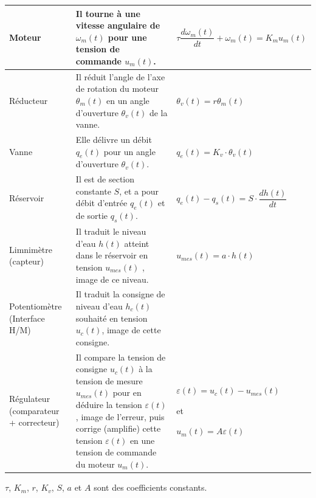 \documentclass[10pt,fleqn]{article} %
\begin{document}
\begin{center}
\begin{tabular}{|p{3cm}|p{7cm}|l|}
\hline
Moteur & 
Il tourne à une vitesse angulaire de $\omega_m(t)$ pour une tension de commande $u_m(t)$. &
$\tau \dfrac{d\omega_m(t)}{dt} + \omega_m(t) = K_m u_m(t)$ \\
\hline
Réducteur & 
Il réduit l'angle de l'axe de rotation du moteur $\theta_m(t)$
en un angle d'ouverture $\theta_v(t)$ de la vanne.&
$\theta_v(t)=r\theta_m(t)$\\
\hline
Vanne & 
Elle délivre un débit $q_e(t)$ pour un angle d'ouverture $\theta_v(t)$. &
$q_e(t)= K_v \cdot \theta_v(t) $ \\
\hline
Réservoir & 
Il est de section constante $S$, et a pour débit d’entrée
$q_e (t)$ et de sortie $q_s (t)$.&
$q_e(t)-q_s(t)=S\cdot\dfrac{dh(t)}{dt}$\\
\hline
Limnimètre (capteur) & 
Il traduit le niveau d'eau $h(t)$ atteint dans le réservoir
en tension $u_{mes}(t)$ , image de ce niveau. &
$u_{mes}(t) = a \cdot h(t)$ \\
\hline
Potentiomètre (Interface H/M) & 
Il traduit la consigne de niveau d'eau $h_c(t)$ souhaité
en tension $u_c(t)$, image de cette consigne. &
\\
\hline 
Régulateur (comparateur + correcteur) & 
Il compare la tension de consigne $u_c(t)$ à la tension
de mesure $u_{mes}(t)$ pour en déduire la tension $\varepsilon(t)$ ,
image de l’erreur, puis corrige (amplifie) cette tension
$\varepsilon (t)$ en une tension de commande du moteur $u_m(t)$.
&
$\varepsilon(t) = u_c(t)-u_{mes}(t)$

et

$u_m(t)=A\varepsilon(t)$\\
\hline
\end{tabular}
\end{center}

$\tau$, $K_m$, $r$, $K_v$, $S$, $a$ et $A$ sont des coefficients constants. 
\fi
\end{document}
